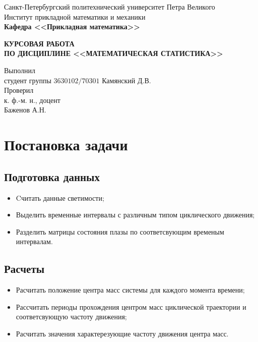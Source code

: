 \documentclass[a4paper,12pt]{article} %
\begin{document}
	\begin{titlepage}
		\begin{center}
			\begin{large}
				Санкт-Петербургский политехнический университет Петра Великого\\
				Институт прикладной математики и механики\\
				\textbf{Кафедра <<Прикладная математика>>}\\
			\end{large}
			\vfill
			\Large{\textbf{КУРСОВАЯ РАБОТА\\
					ПО ДИСЦИПЛИНЕ <<МАТЕМАТИЧЕСКАЯ СТАТИСТИКА>>}}
		\end{center}
		\vfill
		\flushleft
		Выполнил\\
		студент группы $3630102/70301$
		\flushright
		Камянский Д.В.\\
		\flushleft
		Проверил\\
		к. ф.-м. н., доцент\\
		\flushright
		Баженов А.Н.
		\vfill
	\end{titlepage}

	\section{Постановка задачи}

	\subsection{Подготовка данных}
	\begin{itemize}
		\item Cчитать данные светимости;
		\item Выделить временные интервалы с различным типом циклического движения;
		\item Разделить матрицы состояния плазы по соответсвующим временым интервалам.
	\end{itemize}
	
	\subsection{Расчеты}
	\begin{itemize}
		\item Расчитать положение центра масс системы для каждого момента времени;
		\item Рассчитать периоды прохождения центром масс циклической траектории и соответсвующую частоту движения;
		\item Расчитать значения характерезующие частоту движения центра масс.
	\end{itemize}
	
\end{document}
